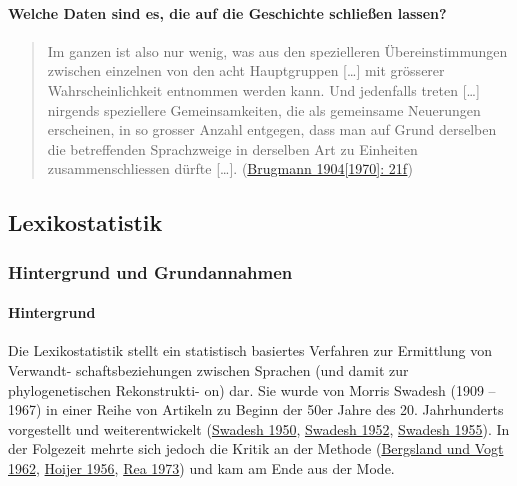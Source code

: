 \paragraph{Welche Daten sind es, die auf die Geschichte schließen lassen?}

\begin{quote}
Im ganzen ist also nur wenig, was aus den spezielleren Übereinstimmungen
zwischen einzelnen von den acht Hauptgruppen {[}\ldots{}{]} mit
grösserer Wahrscheinlichkeit entnommen werden kann. Und jedenfalls
treten {[}\ldots{}{]} nirgends speziellere Gemeinsamkeiten, die als
gemeinsame Neuerungen erscheinen, in so grosser Anzahl entgegen, dass
man auf Grund derselben die betreffenden Sprachzweige in derselben Art
zu Einheiten zusammenschliessen dürfte {[}\ldots{}{]}.
(\href{http://bibliography.lingpy.org?key=Brugmann1904}{Brugmann
1904{[}1970{]}: 21f})
\end{quote}

\subsection{Lexikostatistik}

\subsubsection{\texorpdfstring{{Hintergrund und
Grundannahmen}}{Hintergrund und Grundannahmen}}

\paragraph{Hintergrund}

Die Lexikostatistik stellt ein statistisch basiertes Verfahren zur
Ermittlung von Verwandt- schaftsbeziehungen zwischen Sprachen (und damit
zur phylogenetischen Rekonstrukti- on) dar. Sie wurde von Morris Swadesh
(1909 -- 1967) in einer Reihe von Artikeln zu Beginn der 50er Jahre des
20. Jahrhunderts vorgestellt und weiterentwickelt
(\href{http://bibliography.lingpy.org?key=Swadesh1950}{Swadesh 1950},
\href{http://bibliography.lingpy.org?key=Swadesh1952}{Swadesh 1952},
\href{http://bibliography.lingpy.org?key=Swadesh1955}{Swadesh 1955}). In
der Folgezeit mehrte sich jedoch die Kritik an der Methode
(\href{http://bibliography.lingpy.org?key=Bergsland1962}{Bergsland und
Vogt 1962}, \href{http://bibliography.lingpy.org?key=Hoijer1956}{Hoijer
1956}, \href{http://bibliography.lingpy.org?key=Rea1973}{Rea 1973}) und
kam am Ende aus der Mode.




